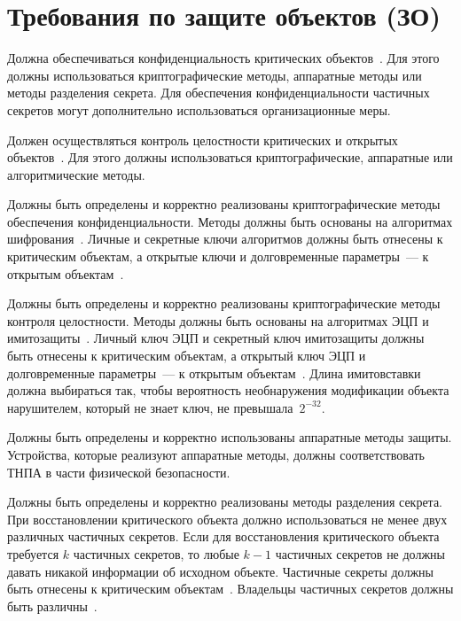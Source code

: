 \section{Требования по защите объектов (ЗО)}

\label{DPTCrit}
Должна обеспечиваться конфиденциальность критических объектов~.
Для этого должны использоваться криптографические методы, 
аппаратные методы или методы разделения секрета. 
Для обеспечения конфиденциальности частичных секретов
могут дополнительно использоваться организационные меры.

\label{DPTPublic}
Должен осуществляться контроль целостности критических и открытых 
объектов~.
Для этого должны использоваться криптографические, аппаратные 
или алгоритмические методы. 
%

\label{DPTCryptoEncr}
Должны быть определены и корректно реализованы
криптографические методы обеспечения конфиденциальности.
Методы должны быть основаны на алгоритмах шифрования~.
%
Личные и секретные ключи алгоритмов должны быть отнесены к критическим объектам, 
а открытые ключи и долговременные параметры~--- 
к открытым объектам~.
%

\label{DPTCryptoIntegrity}
Должны быть определены и корректно реализованы
криптографические методы контроля целостности.
Методы должны быть основаны на алгоритмах ЭЦП и
имитозащиты~.
%
Личный ключ ЭЦП и секретный ключ имитозащиты должны быть отнесены 
к критическим объектам, а открытый ключ ЭЦП и долговременные параметры~---
к открытым объектам~.
%
Длина имитовставки должна выбираться так, 
чтобы вероятность необнаружения 
модификации объекта нарушителем, который не знает ключ, 
не превышала~$2^{-32}$.

\label{DPTHard}
Должны быть определены и корректно использованы аппаратные методы защиты.
Устройства, которые реализуют аппаратные методы, 
должны соответствовать ТНПА
в части физической безопасности.

\label{DPTSplit}
Должны быть определены и корректно реализованы методы разделения секрета.
При восстановлении критического объекта должно использоваться 
не менее двух различных частичных секретов.
%
Если для восстановления критического объекта требуется $k$ частичных секретов,
то любые $k-1$ частичных секретов не 
должны давать никакой информации об исходном объекте.
%
Частичные секреты должны быть отнесены к критическим объектам~.
%
Владельцы частичных секретов должны быть различны~.

